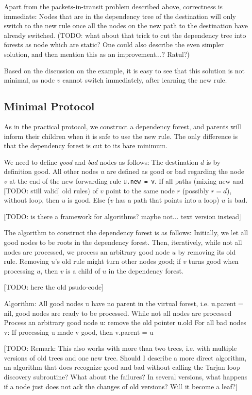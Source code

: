 Apart from the packets-in-transit problem described above, correctness is immediate: Nodes that are in the dependency tree of the destination will only switch to the new rule once all the nodes on the new path to the destination have already switched. (TODO: what about that trick to cut the dependency tree into forests as node which are static? One could also describe the even simpler solution, and then mention this as an improvement...? Ratul?)

Based on the discussion on the example, it is easy to see that this solution is not minimal, as node $v$ cannot switch immediately, after learning the new rule.

\subsection{Minimal Protocol}

As in the practical protocol, we construct a dependency forest, and parents will inform their children when it is safe to use the new rule. The only difference is that the dependency forest is cut to its bare minimum.

We need to define \emph{good} and \emph{bad} nodes as follows: The destination $d$ is by definition good. All other nodes $u$ are defined as good or bad regarding the node $v$ at the end of the new forwarding rule \texttt{u.new = v}. If all paths (mixing new and [TODO: still valid] old rules) of $v$ point to the same node $r$ (possibly $r = d$), without loop, then $u$ is good. Else ($v$ has a path that points into a loop) $u$ is bad.

[TODO: is there a framework for algorithms? maybe not... text version instead]

The algorithm to construct the dependency forest is as follows: Initially, we let all good nodes to be roots in the dependency forest. Then, iteratively, while not all nodes are processed, we process an arbitrary good node $u$ by removing its old rule. Removing $u$'s old rule might turn other nodes good; if $v$ turns good when processing $u$, then $v$ is a child of $u$ in the dependency forest.

[TODO: here the old psudo-code]

Algorithm:
All good nodes u have no parent in the virtual forest, i.e. u.parent = nil, good nodes are ready to be processed.
While not all nodes are processed
	Process an arbitrary good node u: remove the old pointer u.old
	For all bad nodes v:
		If processing u made v good, then v.parent = u

[TODO: Remark: This also works with more than two trees, i.e. with multiple versions of old trees and one new tree. Should I describe a more direct algorithm, an algorithm that does recognize good and bad without calling the Tarjan loop discovery subroutine? What about the failures? In several versions, what happens if a node just does not ack the changes of old versions? Will it become a leaf?]





